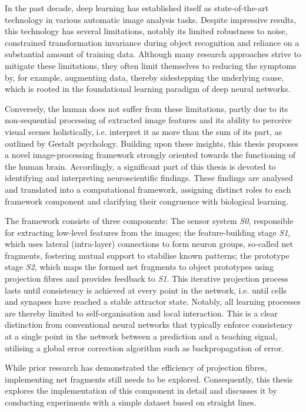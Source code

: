 In the past decade, deep learning has established itself as state-of-the-art technology in various automatic image analysis tasks.
Despite impressive results, this technology has several limitations, notably its limited robustness to noise, constrained transformation invariance during object recognition and reliance on a substantial amount of training data.
Although many research approaches strive to mitigate these limitations, they often limit themselves to reducing the symptoms by, for example, augmenting data, thereby sidestepping the underlying cause, which is rooted in the foundational learning paradigm of deep neural networks.

Conversely, the human does not suffer from these limitations, partly due to its non-sequential processing of extracted image features and its ability to perceive visual scenes holistically, i.e. interpret it as more than the sum of its part, as outlined by Gestalt psychology.
Building upon these insights, this thesis proposes a novel image-processing framework strongly oriented towards the functioning of the human brain.
Accordingly, a significant part of this thesis is devoted to identifying and interpreting neuroscientific findings.
These findings are analysed and translated into a computational framework, assigning distinct roles to each framework component and clarifying their congruence with biological learning.

The framework consists of three components: The sensor system \emph{S0},  responsible for extracting low-level features from the images; the feature-building stage \emph{S1}, which uses lateral (intra-layer) connections to form neuron groups, so-called net fragments,  fostering mutual support to stabilise known patterns; the prototype stage \emph{S2}, which maps the formed net fragments to object prototypes using projection fibres and provides feedback to \emph{S1}.
This iterative projection process lasts until consistency is achieved at every point in the network, i.e. until cells and synapses have reached a stable attractor state.
Notably, all learning processes are thereby limited to self-organisation and local interaction. This is a clear distinction from conventional neural networks that typically enforce consistency at a single point in the network between a prediction and a teaching signal, utilising a global error correction algorithm such as backpropagation of error.

While prior research has demonstrated the efficiency of projection fibres, implementing net fragments still needs to be explored.
Consequently, this thesis explores the implementation of this component in detail and discusses it by conducting experiments with a simple dataset based on straight lines.

